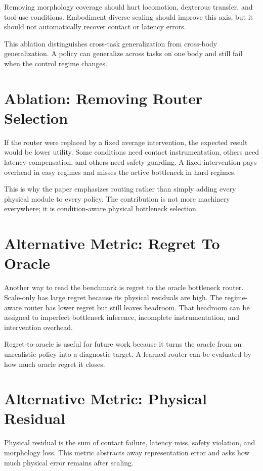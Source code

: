 Removing morphology coverage should hurt locomotion, dexterous transfer, and tool-use conditions. Embodiment-diverse scaling should improve this axis, but it should not automatically recover contact or latency errors.

This ablation distinguishes cross-task generalization from cross-body generalization. A policy can generalize across tasks on one body and still fail when the control regime changes.

\section{Ablation: Removing Router Selection}

If the router were replaced by a fixed average intervention, the expected result would be lower utility. Some conditions need contact instrumentation, others need latency compensation, and others need safety guarding. A fixed intervention pays overhead in easy regimes and misses the active bottleneck in hard regimes.

This is why the paper emphasizes routing rather than simply adding every physical module to every policy. The contribution is not more machinery everywhere; it is condition-aware physical bottleneck selection.

\section{Alternative Metric: Regret To Oracle}

Another way to read the benchmark is regret to the oracle bottleneck router. Scale-only has large regret because its physical residuals are high. The regime-aware router has lower regret but still leaves headroom. That headroom can be assigned to imperfect bottleneck inference, incomplete instrumentation, and intervention overhead.

Regret-to-oracle is useful for future work because it turns the oracle from an unrealistic policy into a diagnostic target. A learned router can be evaluated by how much oracle regret it closes.

\section{Alternative Metric: Physical Residual}

Physical residual is the sum of contact failure, latency miss, safety violation, and morphology loss. This metric abstracts away representation error and asks how much physical error remains after scaling.

